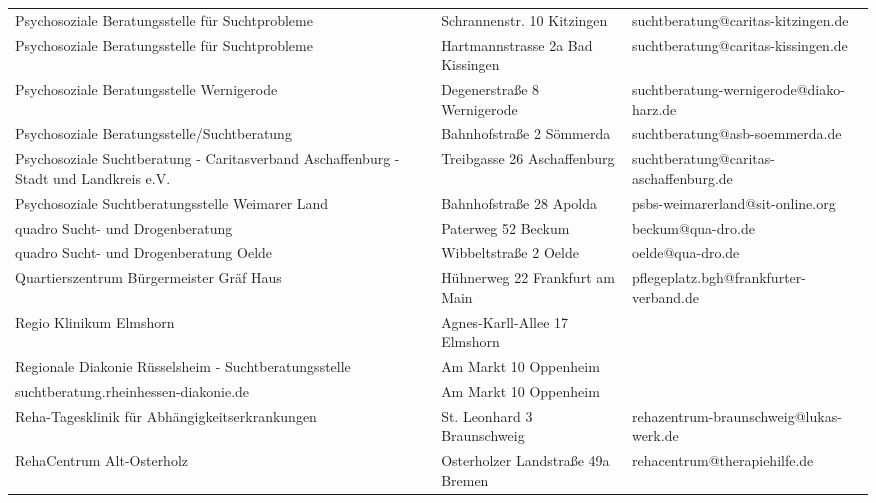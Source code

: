 {\begin{xltabular}{\textwidth} {
 >{\raggedright\arraybackslash}p{5cm}
 >{\raggedright\arraybackslash}X
 >{\raggedright\arraybackslash}p{5cm} }
Psychosoziale Beratungsstelle für Suchtprobleme & Schrannenstr. 10 Kitzingen & suchtberatung@caritas-kitzingen.de \\
Psychosoziale Beratungsstelle für Suchtprobleme & Hartmannstrasse 2a Bad Kissingen & suchtberatung@caritas-kissingen.de \\
Psychosoziale Beratungsstelle Wernigerode & Degenerstraße 8 Wernigerode & suchtberatung-wernigerode@diako-harz.de \\
Psychosoziale Beratungsstelle/Suchtberatung & Bahnhofstraße 2 Sömmerda & suchtberatung@asb-soemmerda.de \\
Psychosoziale Suchtberatung - Caritasverband Aschaffenburg - Stadt und Landkreis e.V. & Treibgasse 26 Aschaffenburg & suchtberatung@caritas-aschaffenburg.de \\
Psychosoziale Suchtberatungsstelle Weimarer Land & Bahnhofstraße 28 Apolda & psbs-weimarerland@sit-online.org \\
quadro Sucht- und Drogenberatung & Paterweg 52 Beckum & beckum@qua-dro.de \\
quadro Sucht- und Drogenberatung Oelde & Wibbeltstraße 2 Oelde & oelde@qua-dro.de \\
Quartierszentrum Bürgermeister Gräf Haus & Hühnerweg 22 Frankfurt am Main & pflegeplatz.bgh@frankfurter-verband.de \\
Regio Klinikum Elmshorn & Agnes-Karll-Allee 17 Elmshorn &  \\
Regionale Diakonie Rüsselsheim - Suchtberatungsstelle & Am Markt 10 Oppenheim &  \\
suchtberatung.rheinhessen-diakonie.de & Am Markt 10 Oppenheim &  \\
Reha-Tagesklinik für Abhängigkeitserkrankungen & St. Leonhard 3 Braunschweig & rehazentrum-braunschweig@lukas-werk.de \\
RehaCentrum Alt-Osterholz & Osterholzer Landstraße 49a Bremen & rehacentrum@therapiehilfe.de \\

\end{xltabular}}
